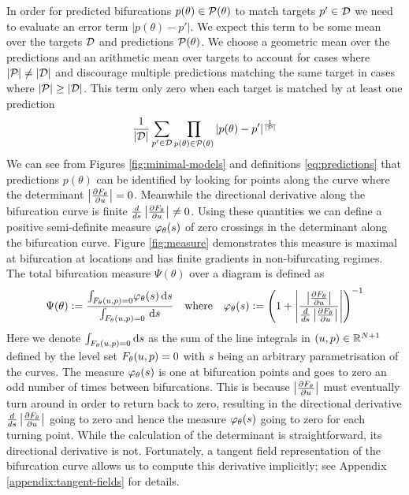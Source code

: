 In order for predicted bifurcations $p(\theta)\in\mathcal{P}(\theta)$ to match targets $p'\in\mathcal{D}$ we need to evaluate an error term $|p(\theta)-p'|$. We expect this term to be some mean over the targets $\mathcal{D}$ and predictions $\mathcal{P}(\theta)$. We choose a geometric mean over the predictions and an arithmetic mean over targets to account for cases where $|\mathcal{P}|\neq|\mathcal{D}|$ and discourage multiple predictions matching the same target in cases where $|\mathcal{P}|\geq|\mathcal{D}|$. This term only zero when each target is matched by at least one prediction
\begin{align}
    \frac{1}{|\mathcal{D}|}\sum_{p'\in\mathcal{D}}
    \prod_{p(\theta)\in\mathcal{P}(\theta)}|p(\theta)-p'|
    ^{\frac{1}{|\mathcal{P}|}}
    \label{eq:error}
\end{align}
We can see from Figures \ref{fig:minimal-models} and definitions \eqref{eq:predictions} that predictions $p(\theta)$ can be identified by looking for points along the curve where the determinant $\left| \frac{\partial F_{\theta}}{\partial u} \right|=0$. Meanwhile the directional derivative along the bifurcation curve is finite $\frac{d}{ds}\left| \frac{\partial F_{\theta}}{\partial u} \right|\neq 0$. Using these quantities we can define a positive semi-definite measure $\varphi_{\theta}(s)$ of zero crossings in the determinant along the bifurcation curve. Figure \ref{fig:measure} demonstrates this measure is maximal at bifurcation at locations and has finite gradients in non-bifurcating regimes. The total bifurcation measure $\Psi(\theta)$ over a diagram is defined as
\begin{align}
    \Psi(\theta):=\frac{
        \int_{F_{\theta}(u,p)=0}\!
        \varphi_{\theta}(s)\,\mathrm{d}s
    }{
        \int_{F_{\theta}(u,p)=0}\!\
        \mathrm{d}s
    }
    \quad\mathrm{where}\quad
    \varphi_{\theta}(s):=
    \left(1+\left|\frac{\left| \frac{\partial F_{\theta}}{\partial u} \right|}{\frac{d}{ds}\left| \frac{\partial F_{\theta}}{\partial u} \right|}\right|\right)^{-1}
    \label{eq:measure}
\end{align}
Here we denote $\int_{F_{\theta}(u,p)=0}\mathrm{d}s$ as the sum of the line integrals in $(u,p)\in\mathbb{R}^{N+1}$ defined by the level set $F_{\theta}(u,p)=0$ with $s$ being an arbitrary parametrisation of the curves. The measure $\varphi_{\theta}(s)$ is one at bifurcation points and goes to zero an odd number of times between bifurcations. This is because $\left| \frac{\partial F_{\theta}}{\partial u} \right|$ must eventually turn around in order to return back to zero, resulting in the directional derivative $\frac{d}{ds}\left| \frac{\partial F_{\theta}}{\partial u} \right|$ going to zero and hence the measure $\varphi_{\theta}(s)$ going to zero for each turning point. While the calculation of the determinant is straightforward, its directional derivative is not. Fortunately, a tangent field representation of the bifurcation curve allows us to compute this derivative implicitly; see Appendix \ref{appendix:tangent-fields} for details.

